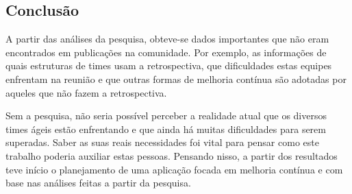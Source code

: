 \subsection{Conclusão}

A partir das análises da pesquisa, obteve-se dados importantes que não eram encontrados em publicações na comunidade. Por exemplo, as informações de quais estruturas de times usam a retrospectiva, que dificuldades estas equipes enfrentam na reunião e que outras formas de melhoria contínua são adotadas por aqueles que não fazem a retrospectiva.

Sem a pesquisa, não seria possível perceber a realidade atual que os diversos times ágeis estão enfrentando e que ainda há muitas dificuldades para serem superadas. 
Saber as suas reais necessidades foi vital para pensar como este trabalho poderia auxiliar estas pessoas. Pensando nisso, a partir dos resultados teve início o planejamento de uma aplicação focada em melhoria contínua e com base nas análises feitas a partir da pesquisa.